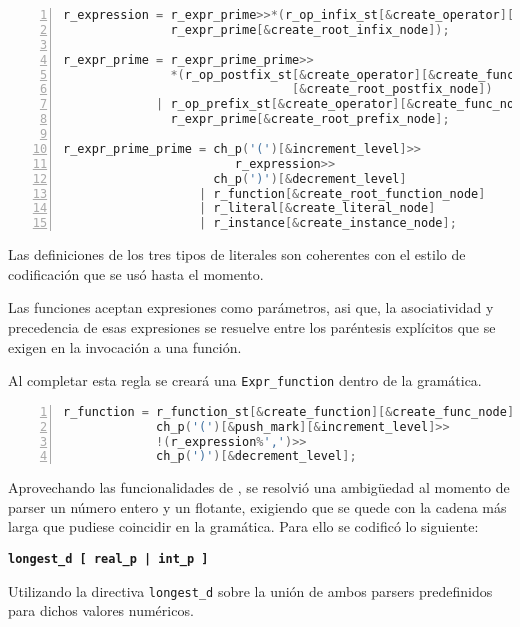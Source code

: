 \begin{lstlisting}[language=C++, basicstyle=\scriptsize, numbers=left, numbersep=5pt, numberstyle=\tiny]
r_expression = r_expr_prime>>*(r_op_infix_st[&create_operator][&create_func_node]>>
               r_expr_prime[&create_root_infix_node]);

r_expr_prime = r_expr_prime_prime>>
               *(r_op_postfix_st[&create_operator][&create_func_node]
                                [&create_root_postfix_node])
             | r_op_prefix_st[&create_operator][&create_func_node]>>
               r_expr_prime[&create_root_prefix_node];

r_expr_prime_prime = ch_p('(')[&increment_level]>>
                        r_expression>>
                     ch_p(')')[&decrement_level]
                   | r_function[&create_root_function_node]
                   | r_literal[&create_literal_node]
                   | r_instance[&create_instance_node];
\end{lstlisting}

Las definiciones de los tres tipos de literales son coherentes con el estilo de codificación que se usó hasta el momento.

Las funciones aceptan expresiones como parámetros, asi que, la asociatividad y precedencia de esas expresiones se resuelve entre los paréntesis explícitos que se exigen en la invocación a una función.

Al completar esta regla se creará una \texttt{Expr\_function} dentro de la gramática.

\begin{lstlisting}[language=C++, basicstyle=\scriptsize, numbers=left, numbersep=5pt, numberstyle=\tiny]
r_function = r_function_st[&create_function][&create_func_node]>>
             ch_p('(')[&push_mark][&increment_level]>>
             !(r_expression%',')>>
             ch_p(')')[&decrement_level];
\end{lstlisting}

Aprovechando las funcionalidades de \spirit, se resolvió una ambigüedad al momento de parser un número entero y un flotante, exigiendo que se quede con la cadena más larga que pudiese coincidir en la gramática. Para ello se codificó lo siguiente:

\begin{center}\textbf{\large{\texttt{longest\_d\ [\ real\_p\ |\ int\_p\ ]}}}\end{center}

Utilizando la directiva \texttt{longest\_d} sobre la unión de ambos parsers predefinidos para dichos valores numéricos.

